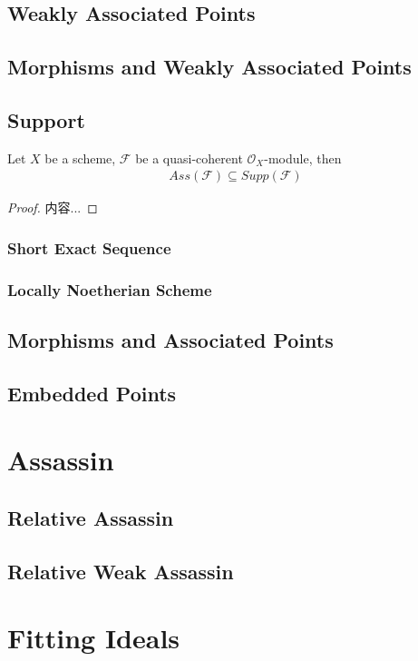 \documentclass[Total.tex]{subfiles}
\begin{document}
			\subsection{Weakly Associated Points}
			\subsection{Morphisms and Weakly Associated Points}
			\subsection{Support}
			\begin{lemma}
				Let $X$ be a scheme, $\mathcal{F}$ be a quasi-coherent $\mathcal{O}_X$-module, then
				\begin{gather*}
					Ass(\mathcal{F})\subseteq Supp(\mathcal{F})
				\end{gather*}
			\end{lemma}
			\begin{proof}
				内容...
			\end{proof}
			\subsubsection{Short Exact Sequence}
			\subsubsection{Locally Noetherian Scheme}
			\subsection{Morphisms and Associated Points}
			\subsection{Embedded Points}
		\section{Assassin}
			\subsection{Relative Assassin}
			\subsection{Relative Weak Assassin}
		\section{Fitting Ideals}
\end{document}
